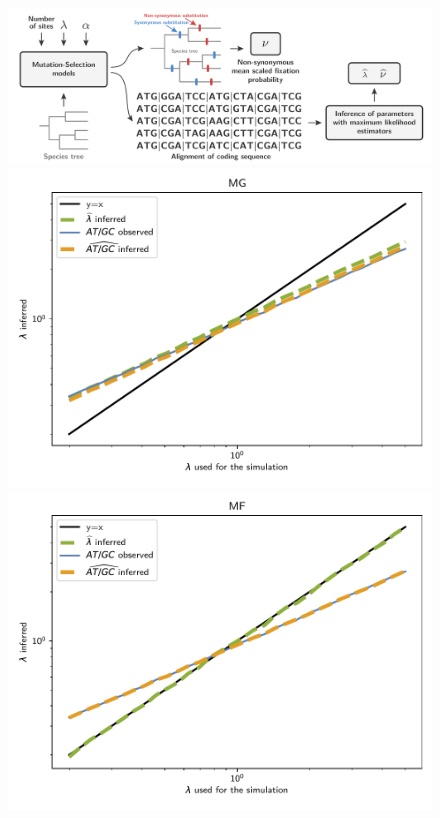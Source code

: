 \documentclass{article}
\begin{document}
\begin{figure}[!htb]
    \centering
    \includegraphics[width=\textwidth, page=1] {pipeline}
    \begin{minipage}{0.49\linewidth}
        \includegraphics[width=\linewidth, page=1]{inference_simulations/lambda_MG}
    \end{minipage}
    \hfill
    \begin{minipage}{0.49\linewidth}
        \includegraphics[width=\linewidth, page=1]{inference_simulations/lambda_MF}

\end{minipage}
\end{figure}
\end{document}
